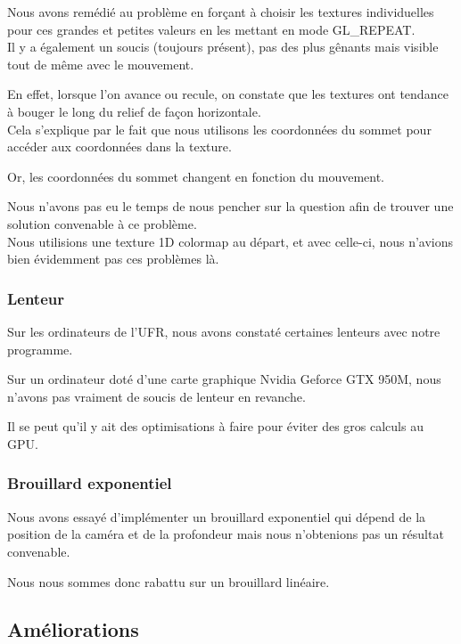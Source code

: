 \documentclass{article}
\begin{document}
Nous avons remédié au problème en forçant à choisir les textures individuelles pour ces grandes et petites valeurs en les mettant en mode GL\_REPEAT.\\

Il y a également un soucis (toujours présent), pas des plus gênants mais visible tout de même avec le mouvement.

En effet, lorsque l'on avance ou recule, on constate que les textures ont tendance à bouger le long du relief de façon horizontale.\\

Cela s'explique par le fait que nous utilisons les coordonnées du sommet pour accéder aux coordonnées dans la texture.

Or, les coordonnées du sommet changent en fonction du mouvement.

Nous n'avons pas eu le temps de nous pencher sur la question afin de trouver une solution convenable à ce problème.\\

Nous utilisions une texture 1D colormap au départ, et avec celle-ci, nous n'avions bien évidemment pas ces problèmes là.

\subsubsection{Lenteur}

Sur les ordinateurs de l'UFR, nous avons constaté certaines lenteurs avec notre programme.

Sur un ordinateur doté d'une carte graphique Nvidia Geforce GTX 950M, nous n'avons pas vraiment de soucis de lenteur en revanche.

Il se peut qu'il y ait des optimisations à faire pour éviter des gros calculs au GPU.

\subsubsection{Brouillard exponentiel}

Nous avons essayé d'implémenter un brouillard exponentiel qui dépend de la position de la caméra et de la profondeur mais nous n'obtenions pas un résultat convenable.

Nous nous sommes donc rabattu sur un brouillard linéaire.

\subsection{Améliorations}
\end{document}
